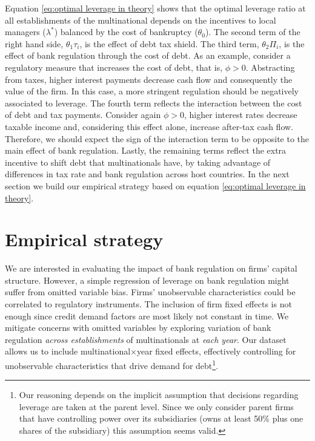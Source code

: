 \documentclass[12pt]{article}
\begin{document}
    Equation \ref{eq:optimal leverage in theory} shows that the optimal leverage ratio at all establishments of the multinational depends on the incentives to local managers ($\lambda^*$) balanced by the cost of bankruptcy ($\theta_0$). The second term of the right hand side, $\theta_1\tau_i$, is the effect of debt tax shield. The third term, $\theta_2\Pi_i$, is the effect of bank regulation through the cost of debt. As an example, consider a regulatory measure that increases the cost of debt, that is, $\phi>0$. Abstracting from taxes, higher interest payments decrease cash flow and consequently the value of the firm. In this case, a more stringent regulation should be negatively associated to leverage. The fourth term reflects the interaction between the cost of debt and tax payments. Consider again $\phi>0$, higher interest rates decrease taxable income and, considering this effect alone, increase after-tax cash flow. Therefore, we should expect the sign of the interaction term to be opposite to the main effect of bank regulation. Lastly, the remaining terms reflect the extra incentive to shift debt that multinationals have, by taking advantage of differences in tax rate and bank regulation across host countries. In the next section we build our empirical strategy based on equation \ref{eq:optimal leverage in theory}.
        
    	\section{Empirical strategy}
    \label{sec:strategy}
    
    We are interested in evaluating the impact of bank regulation on firms' capital structure. However, a simple regression of leverage on bank regulation might suffer from omitted variable bias. Firms' unobservable characteristics could be correlated to regulatory instruments. The inclusion of firm fixed effects is not enough since credit demand factors are most likely not constant in time. We mitigate concerns with omitted variables by exploring variation of bank regulation \textit{across establishments} of multinationals at \textit{each year}. Our dataset allows us to include multinational$\times$year fixed effects, effectively controlling for unobservable characteristics that drive demand for debt\footnote{Our reasoning depends on the implicit assumption that decisions regarding leverage are taken at the parent level. Since we only consider parent firms that have controlling power over its subsidiaries (owns at least 50\% plus one shares of the subsidiary) this assumption seems valid.}. 
    
\end{document}
